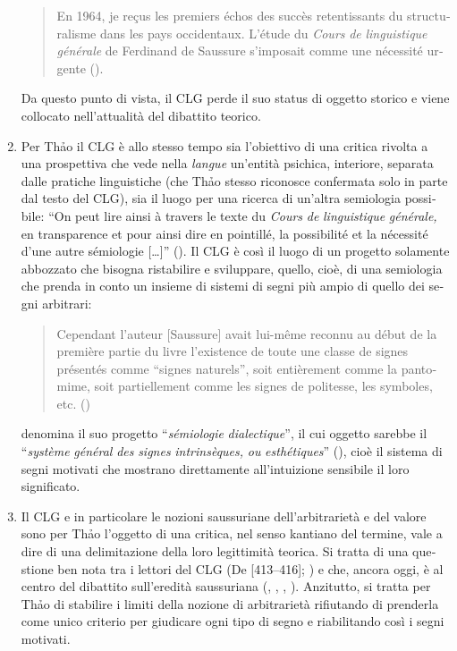 \documentclass[output=paper]{../langscibook}
\begin{document}
\begin{otherlanguage}{italian}
\begin{enumerate}
\begin{quote} 
En 1964, je reçus les premiers échos des succès retentissants du structuralisme dans les pays occidentaux. L’étude du \textit{Cours} \textit{de} \textit{linguistique} \textit{générale} de Ferdinand de Saussure s’imposait comme une nécessité urgente (\citealt[39]{thao_phenomenologie_1974}).
\end{quote}

Da questo punto di vista, il CLG perde il suo status di oggetto storico e viene collocato nell’attualità del dibattito teorico.

\item Per Th\textlatin{ả}o il CLG è allo stesso tempo sia l’obiettivo di una critica rivolta a una prospettiva che vede nella \textit{langue} un’entità psichica, interiore, separata dalle pratiche linguistiche (che Th\textlatin{ả}o stesso riconosce confermata solo in parte dal testo del CLG), sia il luogo per una ricerca di un’altra semiologia possibile: “On peut lire ainsi à travers le texte du \textit{Cours} \textit{de} \textit{linguistique} \textit{générale,} en transparence et pour ainsi dire en pointillé, la possibilité et la nécessité d’une autre sémiologie […]” (\citealt[40]{thao_phenomenologie_1974}). Il CLG è così il luogo di un progetto solamente abbozzato che bisogna ristabilire e sviluppare, quello, cioè, di una semiologia che prenda in conto un insieme di sistemi di segni più ampio di quello dei segni arbitrari:

\begin{quote}
Cependant l’auteur [Saussure] avait lui-même reconnu au début de la première partie du livre l’existence de toute une classe de signes présentés comme “signes naturels”, soit entièrement comme la pantomime, soit partiellement comme les signes de politesse, les symboles, etc. (\citealt[39]{thao_phenomenologie_1974})
\end{quote}

\citet[42]{thao_phenomenologie_1974} denomina il suo progetto “\textit{sémiologie} \textit{dialectique}”, il cui oggetto sarebbe il “\textit{système} \textit{général} \textit{des} \textit{signes} \textit{intrinsèques,} \textit{ou} \textit{esthétiques}” (\citealt[40]{thao_phenomenologie_1974}), cioè il sistema di segni motivati che mostrano direttamente all’intuizione sensibile il loro significato.

\item Il CLG e in particolare le nozioni saussuriane dell’arbitrarietà e del valore sono per Th\textlatin{ả}o l’oggetto di una critica, nel senso kantiano del termine, vale a dire di una delimitazione della loro legittimità teorica. Si tratta di una questione ben nota tra i lettori del CLG (De \citealt{de_mauro_note_2011}[413--416]; \citealt{sofia_petite_2013}) e che, ancora oggi, è al centro del dibattito sull’eredità saussuriana (\citealt{rastier_valeur_2002}, \citealt{paolucci_identite_2012}, \citealt{laks_phonotactique_2012}, \citealt{coursil_valeurs_2015}). Anzitutto, si tratta per Th\textlatin{ả}o di stabilire i limiti della nozione di arbitrarietà rifiutando di prenderla come unico criterio per giudicare ogni tipo di segno e riabilitando così i segni motivati.


\end{enumerate}
\end{otherlanguage}
\end{document}
